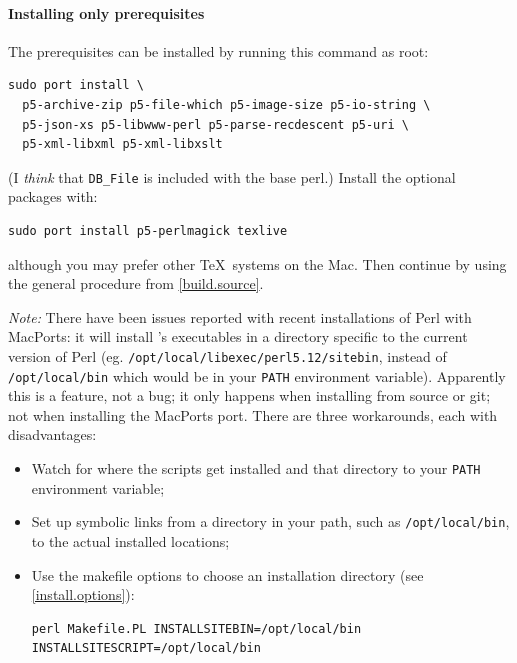 \documentclass{article}
\begin{document}

\paragraph{Installing only prerequisites}
The prerequisites can be installed by running this command as root: 
\begin{lstlisting}[style=shell]
sudo port install \
  p5-archive-zip p5-file-which p5-image-size p5-io-string \
  p5-json-xs p5-libwww-perl p5-parse-recdescent p5-uri \
  p5-xml-libxml p5-xml-libxslt
\end{lstlisting}
(I \emph{think} that \verb|DB_File| is included with the base perl.)
Install the optional packages with:
\begin{lstlisting}[style=shell]
sudo port install p5-perlmagick texlive
\end{lstlisting}
although you may prefer other \TeX\ systems on the Mac.
Then continue by using the general procedure from \ref{build.source}.


\emph{Note:} There have been issues reported with recent
installations of Perl with MacPorts:  it will install \LaTeXML's
executables in a directory specific to the current version of Perl
(eg. \texttt{/opt/local/libexec/perl5.12/sitebin},
instead of \texttt{/opt/local/bin} which would be in your \texttt{PATH} environment variable).
Apparently this is a feature, not a bug; it only happens when installing from source or git;
not when installing the MacPorts port.  There are three workarounds, each with disadvantages:
\begin{itemize}
\item Watch for where the scripts get installed and that directory to your \texttt{PATH}
  environment variable;
\item Set up symbolic links from a directory in your path, such as \texttt{/opt/local/bin},
  to the actual installed locations;
\item Use the makefile options to choose an installation directory (see \ref{install.options}):
\begin{lstlisting}[style=shell]
perl Makefile.PL INSTALLSITEBIN=/opt/local/bin INSTALLSITESCRIPT=/opt/local/bin
\end{lstlisting}
\end{itemize}
\end{document}
